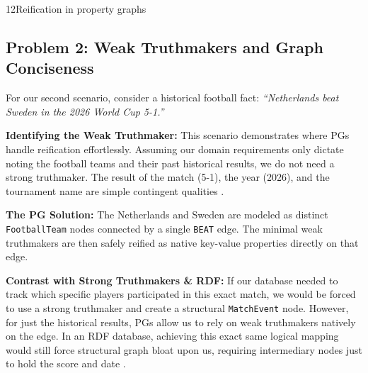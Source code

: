 \begin{question}{1}{2}{Reification in property graphs}
\subsection{Problem 2: Weak Truthmakers and Graph Conciseness}

For our second scenario, consider a historical football fact: \textit{``Netherlands beat Sweden in the 2026 World Cup 5-1.''}

\textbf{Identifying the Weak Truthmaker:} This scenario demonstrates where PGs handle reification effortlessly. Assuming our domain requirements only dictate noting the football teams and their past historical results, we do not need a strong truthmaker. The result of the match (5-1), the year (2026), and the tournament name are simple contingent qualities \cite{guarino_reification_2018}. 

\textbf{The PG Solution:} The Netherlands and Sweden are modeled as distinct \texttt{FootballTeam} nodes connected by a single \texttt{BEAT} edge. The minimal weak truthmakers are then safely reified as native key-value properties directly on that edge. 

\textbf{Contrast with Strong Truthmakers \& RDF:} If our database needed to track which specific players participated in this exact match, we would be forced to use a strong truthmaker and create a structural \texttt{MatchEvent} node. However, for just the historical results, PGs allow us to rely on weak truthmakers natively on the edge. In an RDF database, achieving this exact same logical mapping would still force structural graph bloat upon us, requiring intermediary nodes just to hold the score and date \cite{hernandez_reifying_nodate}.

\begin{figure}[htbp]
\centering
{}
\end{figure}
\end{question}
